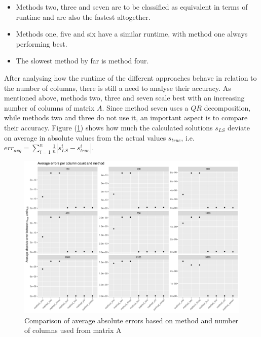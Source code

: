 \begin{itemize}
	\item Methods two, three and seven are to be classified as equivalent in terms of runtime and are also the fastest altogether.
	\item Methods one, five and six have a similar runtime, with method one always performing best.
	\item The slowest method by far is method four. 
\end{itemize}

After analysing how the runtime of the different approaches behave in relation to the number of columns, there is still a need to analyse their accuracy. As mentioned above, methods two, three and seven scale best with an increasing number of columns of matrix $A$. Since method seven uses a $QR$ decomposition, while methods two and three do not use it, an important aspect is to compare their accuracy. Figure (\ref{fig:avg_errors}) shows how much the calculated solutions $s_{LS}$ deviate on average in absolute values from the actual values $s_{true}$, i.e. $err_{avg} = \sum_{i = 1}^{n} \frac{1}{n}| s_{LS}^i - s_{true}^i | $.
\begin{figure}
	\centering
	\includegraphics[width=\textwidth]{figures/chapter_NNLS/errors_per_col}
	\caption{Comparison of average absolute errors based on method and number of columns used from matrix A}
	\label{fig:avg_errors}
\end{figure}
